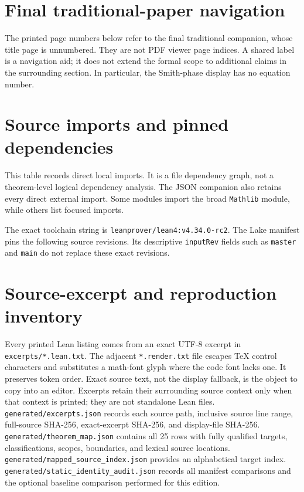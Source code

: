 \documentclass[11pt,a4paper]{article}
\newcommand{\code}[1]{\nolinkurl{#1}}
\begin{document}
\section{Final traditional-paper navigation}\label{app:crosswalk}
The printed page numbers below refer to the final traditional companion, whose title page is unnumbered. They are not PDF viewer page indices. A shared label is a navigation aid; it does not extend the formal scope to additional claims in the surrounding section. In particular, the Smith-phase display has no equation number.

\section{Source imports and pinned dependencies}\label{app:imports}
This table records direct local imports. It is a file dependency graph, not a theorem-level logical dependency analysis. The JSON companion also retains every direct external import. Some modules import the broad \code{Mathlib} module, while others list focused imports.

The exact toolchain string is \code{leanprover/lean4:v4.34.0-rc2}. The Lake manifest pins the following source revisions. Its descriptive \code{inputRev} fields such as \code{master} and \code{main} do not replace these exact revisions.

\section{Source-excerpt and reproduction inventory}\label{app:inventory}
Every printed Lean listing comes from an exact UTF-8 excerpt in \code{excerpts/*.lean.txt}. The adjacent \code{*.render.txt} file escapes TeX control characters and substitutes a math-font glyph where the code font lacks one. It preserves token order. Exact source text, not the display fallback, is the object to copy into an editor. Excerpts retain their surrounding source context only when that context is printed; they are not standalone Lean files.
\code{generated/excerpts.json} records each source path, inclusive source line range, full-source SHA-256, exact-excerpt SHA-256, and display-file SHA-256. \code{generated/theorem_map.json} contains all 25 rows with fully qualified targets, classifications, scopes, boundaries, and lexical source locations. \code{generated/mapped_source_index.json} provides an alphabetical target index. \code{generated/static_identity_audit.json} records all manifest comparisons and the optional baseline comparison performed for this edition.
\end{document}
